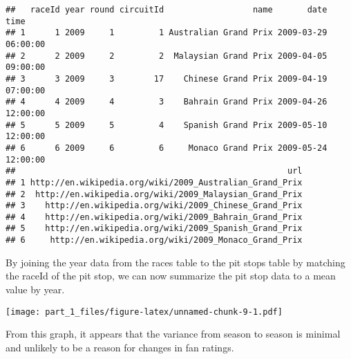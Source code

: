 \documentclass[]{article}
\newenvironment{Shaded}{\begin{snugshade}}{\end{snugshade}}
\newcommand{\KeywordTok}[1]{\textcolor[rgb]{0.13,0.29,0.53}{\textbf{#1}}}
\newcommand{\DataTypeTok}[1]{\textcolor[rgb]{0.13,0.29,0.53}{#1}}
\newcommand{\DecValTok}[1]{\textcolor[rgb]{0.00,0.00,0.81}{#1}}
\newcommand{\StringTok}[1]{\textcolor[rgb]{0.31,0.60,0.02}{#1}}
\newcommand{\OtherTok}[1]{\textcolor[rgb]{0.56,0.35,0.01}{#1}}
\newcommand{\OperatorTok}[1]{\textcolor[rgb]{0.81,0.36,0.00}{\textbf{#1}}}
\newcommand{\NormalTok}[1]{#1}
\begin{document}
\begin{verbatim}
##   raceId year round circuitId                  name       date     time
## 1      1 2009     1         1 Australian Grand Prix 2009-03-29 06:00:00
## 2      2 2009     2         2  Malaysian Grand Prix 2009-04-05 09:00:00
## 3      3 2009     3        17    Chinese Grand Prix 2009-04-19 07:00:00
## 4      4 2009     4         3    Bahrain Grand Prix 2009-04-26 12:00:00
## 5      5 2009     5         4    Spanish Grand Prix 2009-05-10 12:00:00
## 6      6 2009     6         6     Monaco Grand Prix 2009-05-24 12:00:00
##                                                       url
## 1 http://en.wikipedia.org/wiki/2009_Australian_Grand_Prix
## 2  http://en.wikipedia.org/wiki/2009_Malaysian_Grand_Prix
## 3    http://en.wikipedia.org/wiki/2009_Chinese_Grand_Prix
## 4    http://en.wikipedia.org/wiki/2009_Bahrain_Grand_Prix
## 5    http://en.wikipedia.org/wiki/2009_Spanish_Grand_Prix
## 6     http://en.wikipedia.org/wiki/2009_Monaco_Grand_Prix
\end{verbatim}

By joining the year data from the races table to the pit stops table by
matching the raceId of the pit stop, we can now summarize the pit stop
data to a mean value by year.

\begin{Shaded}
\end{Shaded}

\texttt{[image: part\_1\_files/figure-latex/unnamed-chunk-9-1.pdf]}

From this graph, it appears that the variance from season to season is
minimal and unlikely to be a reason for changes in fan ratings.
\end{document}
